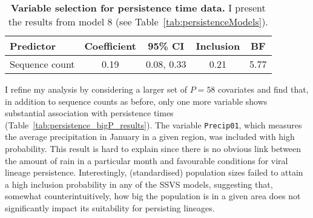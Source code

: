 \begin{minipage}{\textwidth}    
\setcounter{mpfootnote}{\value{footnote}}
\renewcommand{\thempfootnote}{\arabic{mpfootnote}}
\fontsize{9}{11}\selectfont
{}
\begin{longtable}{lcccc}
\caption{\textbf{Variable selection for persistence time data.}
I present the results from model 8 (see Table~\ref{tab:persistenceModels}).}
\label{tab:persistence_glm_results}\\
\toprule
Predictor\footnotemark[1] & Coefficient\footnotemark[2] & 95\% CI\footnotemark[3] & Inclusion\footnotemark[4] & BF\footnotemark[5] \\
\toprule
Sequence count & 0.19 & 0.08, 0.33 & 0.21 & 5.77 \\
\bottomrule
\end{longtable}
\setcounter{footnote}{\value{mpfootnote}}
\end{minipage}

I refine my analysis by considering a larger set of $P = 58$ covariates and find that, in addition to sequence counts as before, only one more variable shows substantial association with persistence times (Table~\ref{tab:persistence_bigP_results}).
The variable \verb|Precip01|, which measures the average precipitation in January in a given region, was included with high probability.
This result is hard to explain since there is no obvious link between the amount of rain in a particular month and favourable conditions for viral lineage persistence.
Interestingly, (standardised) population sizes failed to attain a high inclusion probability in any of the SSVS models, suggesting that, somewhat counterintuitively, how big the population is in a given area does not significantly impact its suitability for persisting lineages. 

